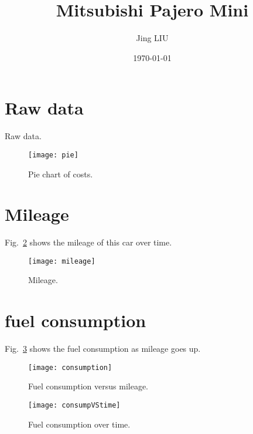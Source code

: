 \documentclass[12pt, a4paper]{article}
\title{Mitsubishi Pajero Mini}
\date{\today}
\author{Jing LIU}
\begin{document}
\maketitle

\begin{abstract}
\end{abstract}

\thispagestyle{empty}

\tableofcontents

\pagebreak \setcounter{page}{1} 


\section{Raw data}
\label{s:data}

\begin{table}[htbp]
  \centering
  
\caption{Raw data.}
\label{t:raw}
\end{table}

\begin{figure} [htbp]
\centering
\texttt{[image: pie]}
\caption{Pie chart of costs.}
\label{f:pie}
\end{figure}

\section{Mileage}
\label{s:mile}

Fig.~\ref{f:mile} shows the mileage of this car over time.

\begin{figure} [htbp]
\centering
\texttt{[image: mileage]}
\caption{Mileage.}
\label{f:mile}
\end{figure}

\section{fuel consumption}
\label{s:cons}

Fig.~\ref{f:cons} shows the fuel consumption as mileage goes up.

\begin{figure} [htbp]
\centering
\texttt{[image: consumption]}
\caption{Fuel consumption versus mileage.}
\label{f:cons}
\end{figure}

\begin{figure} [htbp]
\centering
\texttt{[image: consumpVStime]}
\caption{Fuel consumption over time.}
\label{f:cont}
\end{figure}
\end{document}
